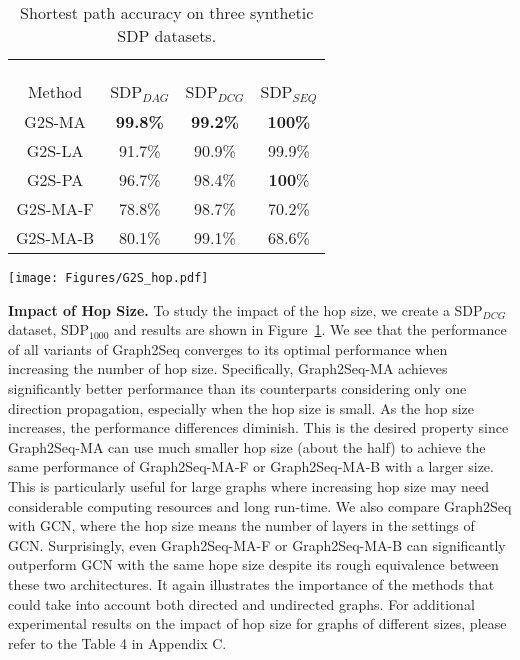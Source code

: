 \documentclass{article} \usepackage{iclr2019_conference,times}
\begin{document}
\begin{table}[t!]
    \begin{minipage}[t]{0.5\linewidth}
     \vspace{0pt}
    \centering
    \small
    \begin{tabular}{cccc}
    \\\\\\\\
    Method & SDP$_{DAG}$ & SDP$_{DCG}$ & SDP$_{SEQ}$ \\
\hline
    G2S-MA & \textbf{99.8\%} & \textbf{99.2\%} & \textbf{100\%} \\
    G2S-LA & 91.7\% & 90.9\% & 99.9\% \\
    G2S-PA & 96.7\% & 98.4\% & \textbf{100}\%  \\
    \hline
    G2S-MA-F & 78.8\% & 98.7\% & 70.2\% \\
    G2S-MA-B & 80.1\% & 99.1\% & 68.6\% \\
    \hline
\end{tabular}
    \caption{Shortest path accuracy on three synthetic SDP datasets.}
    \label{tab:results_agg}
  \end{minipage}
  \begin{minipage}[t]{0.5\linewidth}
    \vspace{0pt}
    \centering\texttt{[image: Figures/G2S\_hop.pdf]}
    \label{tab:results_hop_function}
  \end{minipage}
  \vspace{-0.8cm}
\end{table}


\textbf{Impact of Hop Size.} To study the impact of the hop size, we create a SDP$_{DCG}$ dataset, SDP$_{1000}$ and results are shown in 
Figure~\ref{tab:results_hop_function}. We see that the performance of all variants of Graph2Seq converges to its optimal performance when increasing the number of hop size. Specifically, Graph2Seq-MA achieves significantly better performance than its counterparts considering only one direction propagation, especially when the hop size is small. As the hop size increases, the performance differences diminish. This is the desired property since Graph2Seq-MA can use much smaller hop size (about the half) to achieve the same performance of Graph2Seq-MA-F or Graph2Seq-MA-B with a larger size. This is particularly useful for large graphs where increasing hop size may need considerable computing resources and long run-time. We also compare Graph2Seq with GCN, where the hop size means the number of layers in the settings of GCN. Surprisingly, even Graph2Seq-MA-F or Graph2Seq-MA-B can significantly outperform GCN with the same hope size despite its rough equivalence between these two architectures. It again illustrates the importance of the methods that could take into account both directed and undirected graphs. For additional experimental results on the impact of hop size for graphs of different sizes, please refer to the Table 4 in Appendix C. 
\end{document}
